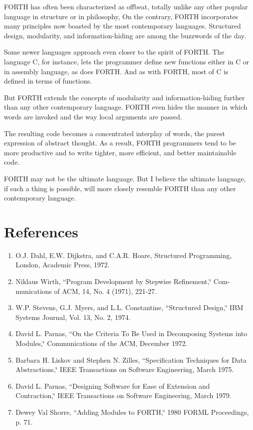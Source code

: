 FORTH has often been characterized as offbeat, totally unlike any
other popular language in structure or in philosophy, On the contrary,
FORTH incorporates many principles now boasted by the most contemporary
languages. Structured design, modularity, and information-hiding are
among the buzzwords of the day.

Some newer languages approach even closer to the spirit of FORTH.
The language C, for instance, lets the programmer define new functions
either in C or in assembly language, as does FORTH. And as with FORTH,
most of C is defined in terms of functions.

But FORTH extends the concepts of modularity and information-hiding
further than any other contemporary language. FORTH even hides the
manner in which words are invoked and the way local arguments are
passed.

The resulting code becomes a concentrated interplay of words, the
purest expression of abstract thought. As a result, FORTH programmers
tend to be more productive and to write tighter, more efficient, and
better maintainable code.

FORTH may not be the ultimate language. But I believe the ultimate
language, if such a thing is possible, will more closely resemble
FORTH than any other contemporary language.


\section{References}

\begin{enumerate}
\item O.J. Dahl, E.W. Dijkstra, and C.A.R. Hoare, Structured Programming,
London, Academic Press, 1972.
\item Niklaus Wirth, {}``Program Development by Stepwise Refinement,\char`\"{}
Com- munications of ACM, 14, No. 4 (1971), 221-27.
\item W.P. Stevens, G.J. Myers, and L.L. Constantine, {}``Structured Design,\char`\"{}
IBM Systems Journal, Vol. 13, No. 2, 1974.
\item David L. Parnas, {}``On the Criteria To Be Used in Decomposing Systems
into Modules,\char`\"{} Communications of the ACM, December 1972.
\item Barbara H. Liskov and Stephen N. Zilles, {}``Specification Techniques
for Data Abstractions,\char`\"{} IEEE Transactions on Software Engineering,
March 1975.
\item David L. Parnas, {}``Designing Software for Ease of Extension and
Contraction,\char`\"{} IEEE Transactions on Software Engineering,
March 1979.
\item Dewey Val Shorre, {}``Adding Modules to FORTH,\char`\"{} 1980 FORML
Proceedings, p. 71.
\end{enumerate}
